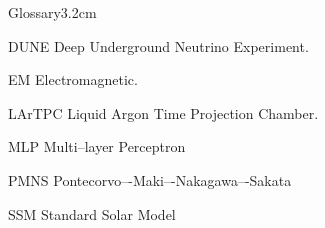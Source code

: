 \begin{mclistof}{Glossary}{3.2cm}

\item[DUNE] Deep Underground Neutrino Experiment.

\item[EM] Electromagnetic.

\item[LArTPC] Liquid Argon Time Projection Chamber.

\item[MLP] Multi--layer Perceptron

\item[PMNS] Pontecorvo–-Maki–-Nakagawa–-Sakata

\item[SSM] Standard Solar Model

\end{mclistof} 
